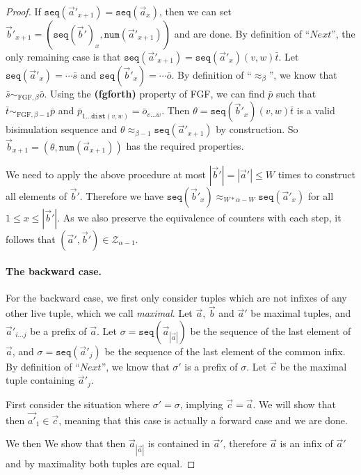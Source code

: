 \documentclass[draft]{scrartcl}
\theoremstyle{definition}
\newcommand{\seq}[1]{\mathtt{seq}({#1})}
\newcommand{\num}[1]{\mathtt{num}({#1})}
\newcommand{\dist}[2]{\mathtt{dist}({#1},{#2})}
\newcommand{\sij}{_{i\ldots{}j}}
\begin{document}
\begin{proof}
  If $\seq{\overrightarrow{a}'_{x+1}} = \seq{\overrightarrow{a}_{x}}$, then we can set $\overrightarrow{b}'_{x+1} = (\seq{\overrightarrow{b}'}_{x}, \num{\overrightarrow{a}'_{x+1}})$ and are done.
  By definition of ``$\mathit{Next}$'', the only remaining case is that $\seq{\overrightarrow{a}'_{x+1}} = \seq{\overrightarrow{a}'_{x}} (v, w) \bar{t}$.
  Let $\seq{\overrightarrow{a}'_{x}} = \cdots{}\bar{s}$ and $\seq{\overrightarrow{b}'_{x}} = \cdots{}\bar{o}$.
  By definition of ``$\approx_{\beta}$'', we know that $\bar{s} \sim_{\mathrm{FGF},\beta} \bar{o}$.
  Using the \textbf{(fgforth)} property of FGF, we can find $\bar{p}$ such that $\bar{t} \sim_{\mathrm{FGF},\beta-1} \bar{p}$ and $\bar{p}_{1\ldots{}\dist{v}{w}} = \bar{o}_{v\ldots{}w}$.
  Then $\theta = \seq{\overrightarrow{b}'_{x}} (v,w) \bar{t}$ is a valid bisimulation sequence and $\theta \approx_{\beta-1} \seq{\overrightarrow{a}'_{x+1}}$ by construction.
  So $\overrightarrow{b}_{x+1} = (\theta, \num{\overrightarrow{a}_{x+1}})$ has the required properties.

  We need to apply the above procedure at most $|\overrightarrow{b}'| = |\overrightarrow{a}'| \le W$ times to construct all elements of $\overrightarrow{b}'$.
  Therefore we have $\seq{\overrightarrow{b}'_{x}} \approx_{W*\alpha-W} \seq{\overrightarrow{a}'_{x}}$ for all $1 \le x \le |\overrightarrow{b}'|$.
  As we also preserve the equivalence of counters with each step, it follows that $(\overrightarrow{a}', \overrightarrow{b}') \in \mathcal{Z}_{\alpha-1}$.

  \paragraph{The backward case.}
  For the backward case, we first only consider tuples which are not infixes of any other live tuple, which we call \emph{maximal}.
  Let $\overrightarrow{a}$, $\overrightarrow{b}$ and $\overrightarrow{a}'$ be maximal tuples, and $\overrightarrow{a}'\sij$ be a prefix of $\overrightarrow{a}$.
  Let $\sigma = \seq{\overrightarrow{a}_{|\overrightarrow{a}|}}$ be the sequence of the last element of $\overrightarrow{a}$, and $\sigma =  \seq{\overrightarrow{a}'_{j}}$ be the sequence of the last element of the common infix.
  By definition of ``$\mathit{Next}$'', we know that $\sigma'$ is a prefix of $\sigma$.
  Let $\overrightarrow{c}$ be the maximal tuple containing $\overrightarrow{a}'_{j}$.

  First consider the situation where $\sigma' = \sigma$, implying $\overrightarrow{c} = \overrightarrow{a}$.
  We will show that then $\overrightarrow{a'}_{1} \in \overrightarrow{c}$, meaning that this case is actually a forward case and we are done.

  We then
  We show that then $\overrightarrow{a}_{|\overrightarrow{a}|}$ is contained in $\overrightarrow{a}'$, therefore $\overrightarrow{a}$ is an infix of $\overrightarrow{a}'$ and by maximality both tuples are equal.


\end{proof}
\end{document}
